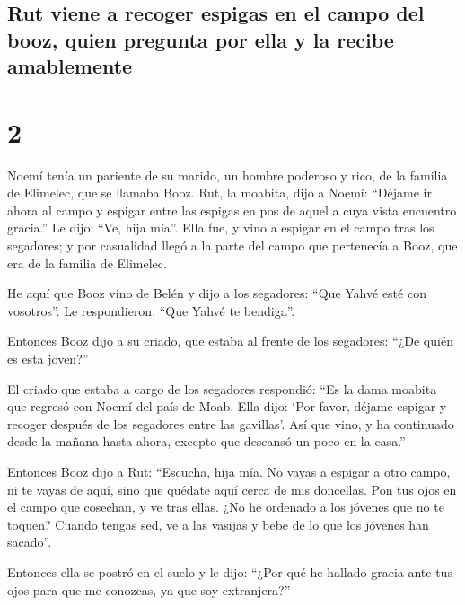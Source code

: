 \hypertarget{rut-viene-a-recoger-espigas-en-el-campo-del-booz-quien-pregunta-por-ella-y-la-recibe-amablemente}{%
\subsection{Rut viene a recoger espigas en el campo del booz, quien
pregunta por ella y la recibe
amablemente}\label{rut-viene-a-recoger-espigas-en-el-campo-del-booz-quien-pregunta-por-ella-y-la-recibe-amablemente}}

\hypertarget{section-1}{%
\section{2}\label{section-1}}

 Noemí tenía un pariente de su marido, un hombre poderoso
y rico, de la familia de Elimelec, que se llamaba Booz. 
Rut, la moabita, dijo a Noemí: ``Déjame ir ahora al campo y espigar
entre las espigas en pos de aquel a cuya vista encuentro gracia.'' Le
dijo: ``Ve, hija mía''.  Ella fue, y vino a espigar en el
campo tras los segadores; y por casualidad llegó a la parte del campo
que pertenecía a Booz, que era de la familia de Elimelec.

 He aquí que Booz vino de Belén y dijo a los segadores:
``Que Yahvé esté con vosotros''. Le respondieron: ``Que Yahvé te
bendiga''.

 Entonces Booz dijo a su criado, que estaba al frente de
los segadores: ``¿De quién es esta joven?''

 El criado que estaba a cargo de los segadores respondió:
``Es la dama moabita que regresó con Noemí del país de Moab.
 Ella dijo: `Por favor, déjame espigar y recoger después
de los segadores entre las gavillas'. Así que vino, y ha continuado
desde la mañana hasta ahora, excepto que descansó un poco en la casa.''

 Entonces Booz dijo a Rut: ``Escucha, hija mía. No vayas a
espigar a otro campo, ni te vayas de aquí, sino que quédate aquí cerca
de mis doncellas.  Pon tus ojos en el campo que cosechan,
y ve tras ellas. ¿No he ordenado a los jóvenes que no te toquen? Cuando
tengas sed, ve a las vasijas y bebe de lo que los jóvenes han sacado''.

 Entonces ella se postró en el suelo y le dijo: ``¿Por
qué he hallado gracia ante tus ojos para que me conozcas, ya que soy
extranjera?''

